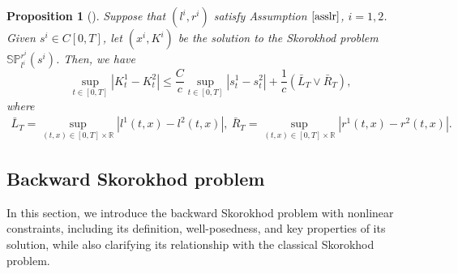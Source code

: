 \documentclass[10pt]{article}%
\numberwithin{equation}{section}
\newtheorem{proposition}[theorem]{Proposition}
\newtheorem{remark}[theorem]{Remark}
\begin{document}
\begin{proposition}[\cite{Li}]\label{continuity}
Suppose that $(l^i,r^i)$ satisfy Assumption $\ref{asslr}$, $i=1,2$.
Given  $s^i\in C[0,T]$, let $(x^i,K^i)$ be the solution to the Skorokhod problem $\mathbb{SP}_{l^i}^{r^i}(s^i)$. Then, we have
\begin{equation}\label{diffk}
\sup_{t\in[0,T]}\left|K^1_t-K^2_t\right|
\leq \frac{C}{c}\sup_{t\in[0,T]}\left|s^1_t-s^2_t\right|+\frac{1}{c}(\bar{L}_T\vee\bar{R}_T),
\end{equation}
where
\begin{align*}
\bar{L}_T=\sup_{(t,x)\in[0,T]\times \mathbb{R}}\left|{l}^1(t,x)-{l}^2(t,x)\right|,\
\bar{R}_T=\sup_{(t,x)\in[0,T]\times \mathbb{R}}\left|{r}^1(t,x)-{r}^2(t,x)\right|.
\end{align*}
\end{proposition}


\subsection{Backward Skorokhod problem}
In this section, we introduce the backward Skorokhod problem with nonlinear constraints, including its definition, well-posedness, and key properties of its solution, while also clarifying its relationship with the classical Skorokhod problem.
\end{document}
